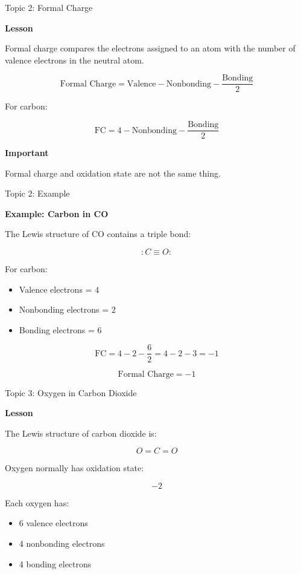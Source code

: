 \documentclass[aspectratio=169]{beamer}
\begin{document}
\begin{frame}[t]{Topic 2: Formal Charge}
\small

\textbf{Lesson}

Formal charge compares the electrons assigned to an atom with the number of valence electrons in the neutral atom.

\[
\text{Formal Charge}
=
\text{Valence}
-
\text{Nonbonding}
-
\frac{\text{Bonding}}{2}
\]

For carbon:

\[
\text{FC}
=
4-\text{Nonbonding}-\frac{\text{Bonding}}{2}
\]

\textbf{Important}

Formal charge and oxidation state are not the same thing.

\end{frame}

\begin{frame}[t]{Topic 2: Example}
\small

\textbf{Example: Carbon in CO}

The Lewis structure of CO contains a triple bond:

\[
:C\equiv O:
\]

For carbon:

\begin{itemize}
    \setlength{\itemsep}{0.06cm}
    \item Valence electrons = $4$
    \item Nonbonding electrons = $2$
    \item Bonding electrons = $6$
\end{itemize}

\[
\text{FC}=4-2-\frac{6}{2}=4-2-3=-1
\]

\[
\boxed{\text{Formal Charge}=-1}
\]

\end{frame}

\begin{frame}[t]{Topic 3: Oxygen in Carbon Dioxide}
\small

\textbf{Lesson}

The Lewis structure of carbon dioxide is:

\[
O=C=O
\]

Oxygen normally has oxidation state:

\[
\boxed{-2}
\]

Each oxygen has:

\begin{itemize}
    \setlength{\itemsep}{0.06cm}
    \item 6 valence electrons
    \item 4 nonbonding electrons
    \item 4 bonding electrons
\end{itemize}

\end{frame}
\end{document}
